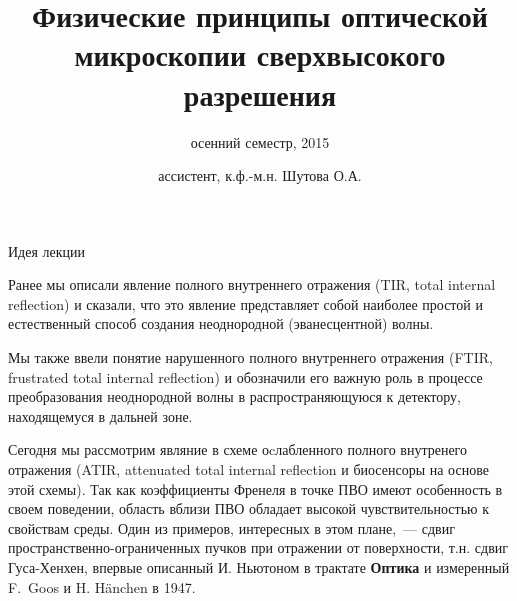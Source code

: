 \documentclass[9pt, compress, xcolor=table]{beamer}
\title{Физические принципы оптической микроскопии сверхвысокого разрешения}
\subtitle{осенний семестр, 2015}
\author{ассистент, к.ф.-м.н. Шутова О.А.}
\institute{МГУ им. М.В. Ломоносова, физический факультет}
\begin{document}
\maketitle


\begin{frame}{Идея лекции}

Ранее мы описали явление полного внутреннего отражения (\textcolor{red!50!black}{TIR, total internal reflection}) и сказали, что это явление представляет собой наиболее простой и естественный способ создания неоднородной (эванесцентной) волны. 

Мы также ввели понятие нарушенного полного внутреннего отражения (\textcolor{red!50!black}{FTIR, frustrated total internal reflection}) и обозначили его важную роль в процессе преобразования неоднородной волны в распространяющуюся к детектору, находящемуся в дальней зоне.

Сегодня мы рассмотрим являние в схеме оcлабленного полного внутренего отражения (\textcolor{red!50!black}{ATIR, attenuated total internal reflection} и биосенсоры на основе этой схемы). Так как коэффициенты Френеля в точке ПВО имеют особенность в своем поведении, область вблизи ПВО обладает высокой чувствительностью к свойствам среды. Один из примеров, интересных в этом плане,~--- сдвиг пространственно-ограниченных пучков при отражении от поверхности, т.н. \textcolor{red!50!black}{сдвиг Гуса-Хенхен}, впервые описанный И. Ньютоном в трактате \textbf{Оптика} и измеренный F.~Goos и H. H\"{a}nchen в 1947.

\end{frame}
\end{document}
